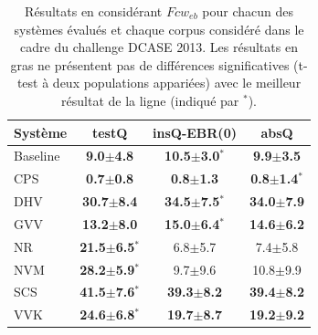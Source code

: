 \begin{table} 
\begin{center}  
\begin{tabular}{lccc}  
Système  & testQ & insQ-EBR(0) & absQ \\ 
\hline 
Baseline & \textbf{ 9.0$\pm$4.8}     & \textbf{10.5$\pm$3.0$^*$}   & \textbf{ 9.9$\pm$3.5} \\ 
CPS      & \textbf{0.7$\pm$0.8}      & \textbf{0.8$\pm$1.3}        & \textbf{0.8$\pm$1.4$^*$} \\ 
DHV      & \textbf{30.7$\pm$8.4}     & \textbf{34.5$\pm$7.5$^*$}   & \textbf{34.0$\pm$7.9} \\ 
GVV      & \textbf{13.2$\pm$8.0}     & \textbf{15.0$\pm$6.4$^*$}   & \textbf{14.6$\pm$6.2} \\ 
NR       & \textbf{21.5$\pm$6.5$^*$} &  6.8$\pm$5.7                &  7.4$\pm$5.8 \\ 
NVM      & \textbf{28.2$\pm$5.9$^*$} &  9.7$\pm$9.6                & 10.8$\pm$9.9 \\ 
SCS      & \textbf{41.5$\pm$7.6$^*$} & \textbf{39.3$\pm$8.2}       & \textbf{39.4$\pm$8.2} \\ 
VVK      & \textbf{24.6$\pm$6.8$^*$} & \textbf{19.7$\pm$8.7}       & \textbf{19.2$\pm$9.2} \\  
\hline
\end{tabular} 
\end{center} 
\caption[Résultats en considérant $Fcw_{eb}$ pour chacun des systèmes évalués et chaque corpus considéré dans le cadre du challenge DCASE 2013]{Résultats en considérant $Fcw_{eb}$ pour chacun des systèmes évalués et chaque corpus considéré dans le cadre du challenge DCASE 2013. Les résultats en gras ne présentent pas de différences significatives (t-test à deux populations appariées) avec le meilleur résultat de la ligne (indiqué par $^*$).} 
\label{tab:qmul} 
\end{table} 

